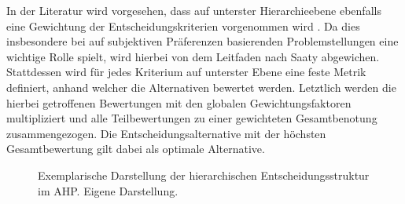 In der Literatur wird vorgesehen, dass auf unterster Hierarchieebene ebenfalls eine Gewichtung der Entscheidungskriterien vorgenommen wird \cite[86]{Saaty.2008}. Da dies insbesondere bei auf subjektiven Präferenzen basierenden Problemstellungen eine wichtige Rolle spielt, wird hierbei von dem Leitfaden nach Saaty abgewichen. Stattdessen wird für jedes Kriterium auf unterster Ebene eine feste Metrik definiert, anhand welcher die Alternativen bewertet werden. Letztlich werden die hierbei getroffenen Bewertungen mit den globalen Gewichtungsfaktoren multipliziert und alle Teilbewertungen zu einer gewichteten Gesamtbenotung zusammengezogen. Die Entscheidungsalternative mit der höchsten Gesamtbewertung gilt dabei als optimale Alternative. 
\begin{center}
	\begin{figure}[H]
		\centering
		\caption[Exemplarische Darstellung der hierarchischen Entscheidungsstruktur im AHP]{Exemplarische Darstellung der hierarchischen Entscheidungsstruktur im AHP. Eigene Darstellung.}
		\label{fig:AHP_B}
	\end{figure}
\end{center}
\vspace*{-10mm}